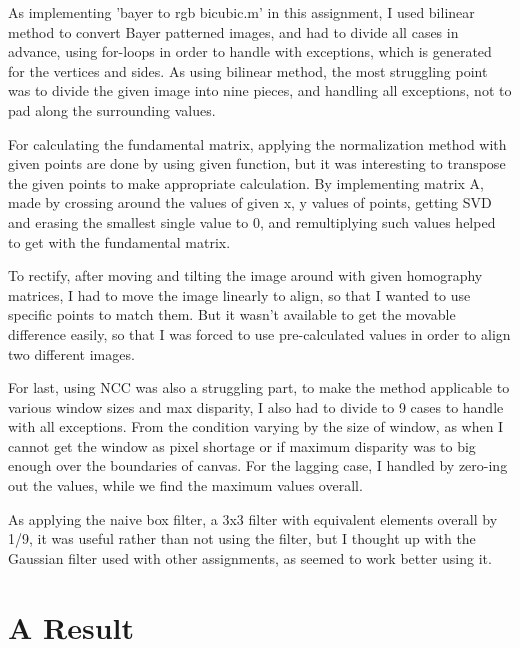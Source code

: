  As implementing 'bayer to rgb bicubic.m' in this assignment, I used bilinear method to convert Bayer patterned images, and had to divide all cases in advance, using for-loops in order to handle with exceptions, which is generated for the vertices and sides. As using bilinear method, the most struggling point was to divide the given image into nine pieces, and handling all exceptions, not to pad along the surrounding values.
 
 For calculating the fundamental matrix, applying the normalization method with given points are done by using given function, but it was interesting to transpose the given points to make appropriate calculation. By implementing matrix A, made by crossing around the values of given x, y values of points, getting SVD and erasing the smallest single value to 0, and remultiplying such values helped to get with the fundamental matrix.
 
 To rectify, after moving and tilting the image around with given homography matrices, I had to move the image linearly to align, so that I wanted to use specific points to match them. But it wasn't available to get the movable difference easily, so that I was forced to use pre-calculated values in order to align two different images.

For last, using NCC was also a struggling part, to make the method applicable to various window sizes and max disparity, I also had to divide to 9 cases to handle with all exceptions. From the condition varying by the size of window, as when I cannot get the window as pixel shortage or if maximum disparity was to big enough over the boundaries of canvas. For the lagging case, I handled by zero-ing out the values, while we find the maximum values overall. 

As applying the naive box filter, a 3x3 filter with equivalent elements overall by 1/9, it was useful rather than not using the filter, but I thought up with the Gaussian filter used with other assignments, as seemed to work better using it. 



\section*{A Result}

